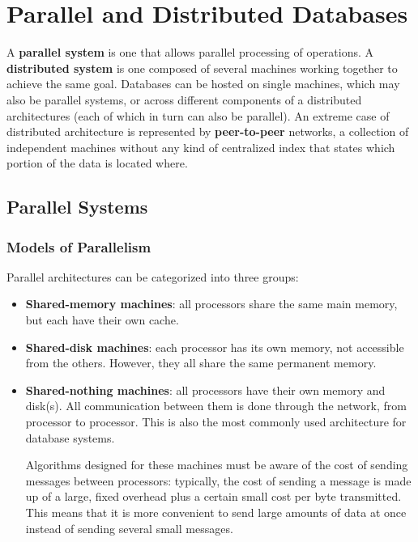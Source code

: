 \chapter{Parallel and Distributed Databases}

A \textbf{parallel system} is one that allows parallel processing of operations. A \textbf{distributed system} is one composed of several machines working together to achieve the same goal. Databases can be hosted on single machines, which may also be parallel systems, or across different components of a distributed architectures (each of which in turn can also be parallel). An extreme case of distributed architecture is represented by \textbf{peer-to-peer} networks, a collection of independent machines without any kind of centralized index that states which portion of the data is located where.

\section{Parallel Systems}

\subsection{Models of Parallelism}

Parallel architectures can be categorized into three groups:
\begin{itemize}
    \item \textbf{Shared-memory machines}: all processors share the same main memory, but each have their own cache.

    \item \textbf{Shared-disk machines}: each processor has its own memory, not accessible from the others. However, they all share the same permanent memory.

    \item \textbf{Shared-nothing machines}: all processors have their own memory and disk(s). All communication between them is done through the network, from processor to processor. This is also the most commonly used architecture for database systems.

    Algorithms designed for these machines must be aware of the cost of sending messages between processors: typically, the cost of sending a message is made up of a large, fixed overhead plus a certain small cost per byte transmitted. This means that it is more convenient to send large amounts of data at once instead of sending several small messages.
\end{itemize}

